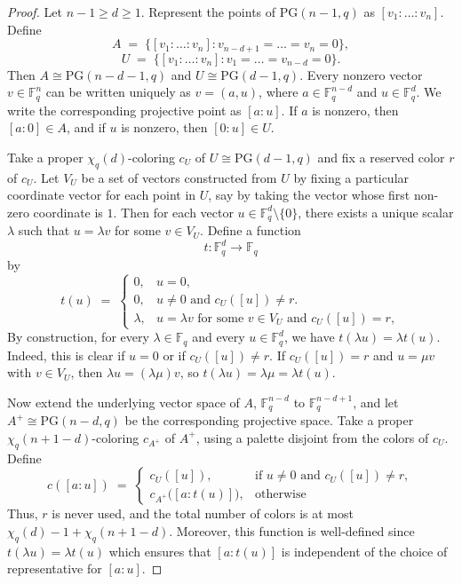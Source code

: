 \documentclass[10pt,a4paper]{amsart}
\newcommand{\PG}{\mathrm{PG}}
\begin{document}
\begin{proof}
Let $n-1\ge d\ge 1$.
Represent the points of $\PG(n-1,q)$ as $[v_1:\dots:v_n]$.
Define
\[
A \;=\; \bigl\{[v_1:\dots:v_n] : v_{n-d+1}=\dots=v_n=0\bigr\},
\]
\[
U \;=\; \bigl\{[v_1:\dots:v_n] : v_1=\dots=v_{n-d}=0\bigr\}.
\]
Then $A\cong\PG(n-d-1,q)$ and $U\cong\PG(d-1,q)$.
Every nonzero vector $v\in \mathbb F_q^n$ can be written uniquely as $v=(a,u)$, where $a\in \mathbb F_q^{n-d}$ and $u\in \mathbb F_q^d$. We write the corresponding projective point as $[a:u]$.
If $a$ is nonzero, then $[a:0]\in A$, and if $u$ is nonzero, then $[0:u]\in U$.

Take a proper $\chi_q(d)$-coloring $c_U$ of $U\cong\PG(d-1,q)$ and fix a reserved color $r$ of $c_U$.
Let $V_U$ be a set of vectors constructed from $U$ by fixing a particular coordinate vector for each point in $U$, say by taking the vector whose first non-zero coordinate is $1$.
Then for each vector $u \in \mathbb{F}_q^{d} \setminus \{0\}$, there exists a unique scalar $\lambda$ such that $u = \lambda v$ for some $v \in V_U$.
Define a function
\[
t:\mathbb{F}_q^{d} \longrightarrow \mathbb{F}_q
\]
by
\[
t(u) \;=\;
\begin{cases}
0, & u=0,\\
0, & u\neq 0 \text{ and } c_U([u])\neq r.\\
\lambda, & u = \lambda v  \text{ for some } v \in V_U \text{ and } c_U([u])=r,
\end{cases}
\]
By construction, for every $\lambda\in\mathbb F_q$ and every $u\in\mathbb F_q^d$, we have $t(\lambda u)=\lambda t(u)$.
Indeed, this is clear if $u=0$ or if $c_U([u])\neq r$. If $c_U([u])=r$ and $u=\mu v$ with $v\in V_U$, then $\lambda u=(\lambda\mu)v$, so $t(\lambda u)=\lambda\mu=\lambda t(u)$.

Now extend the underlying vector space of $A$, $\mathbb F_q^{n-d}$ to $\mathbb F_q^{n-d+1}$, and let $A^+\cong\PG(n-d,q)$ be the corresponding projective space.
Take a proper $\chi_q(n+1-d)$-coloring $c_{A^+}$ of $A^+$, using a palette disjoint from the colors of $c_U$.
Define
\[
c([a:u]) \;=\;
\begin{cases}
c_U([u]), & \text{if } u\neq 0 \text{ and } c_U([u])\neq r,\\[3pt]
c_{A^+}\bigl([a:t(u)]\bigr), & \text{otherwise}
\end{cases}
\]
Thus, $r$ is never used, and the total number of colors is at most $\chi_q(d)-1+\chi_q(n+1-d)$.
Moreover, this function is well-defined since $t(\lambda u) = \lambda t(u)$ which ensures that $[a:t(u)]$ is independent of the choice of representative for $[a:u]$.



\end{proof}
\end{document}
